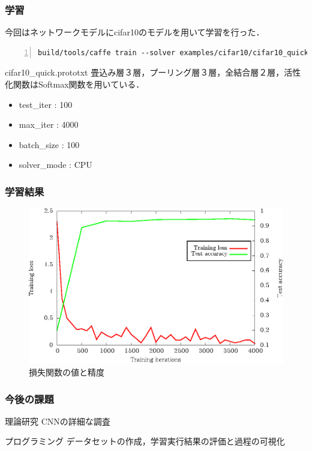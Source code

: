 \documentclass[dvipdfmx,11pt,notheorems]{beamer}
\theoremstyle{definition}
\begin{document}
\begin{frame}[fragile]\frametitle{学習}
 今回はネットワークモデルにcifar10のモデルを用いて学習を行った．
\begin{lstlisting}[basicstyle=\ttfamily\footnotesize, frame=single, tabsize=2,showtabs,firstnumber=1, numbers=left, breaklines=true]
build/tools/caffe train --solver examples/cifar10/cifar10_quick_solver.prototxt
\end{lstlisting}
\begin{exampleblock}{cifar10\_quick.prototxt}
 畳込み層３層，プーリング層３層，全結合層２層，活性化関数はSoftmax関数を用いている．
\end{exampleblock}
\begin{itemize}
 \item test\_iter : 100
 \item max\_iter : 4000
 \item batch\_size : 100
 \item solver\_mode : CPU
\end{itemize}
\end{frame}

\begin{frame}[fragile]\frametitle{学習結果}
\begin{figure}[ht]
 \centering
 \includegraphics[scale=1.0]{fig/eps/result_train_test_graph.eps}
 \caption{損失関数の値と精度 }
\end{figure}

\end{frame}
\begin{frame}\frametitle{今後の課題}

\begin{block}{理論研究}
CNNの詳細な調査
\end{block}

\vspace{1cm}
\begin{exampleblock}{プログラミング}
データセットの作成，学習実行結果の評価と過程の可視化
\end{exampleblock}
\end{frame}
\end{document}
